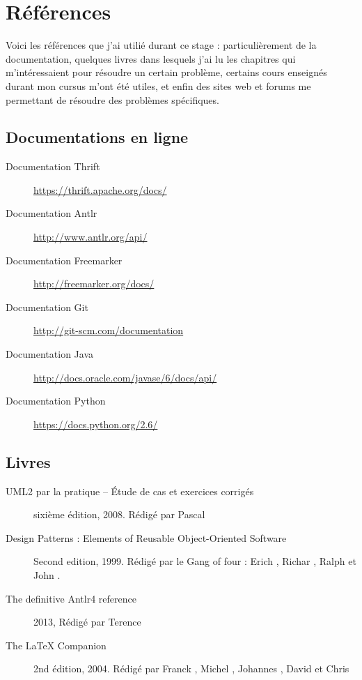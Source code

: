 \chapter{Références}
Voici les références que j'ai utilié durant ce stage : particulièrement de la documentation, quelques livres dans lesquels j'ai lu les chapitres qui m'intéressaient pour résoudre un certain problème, certains cours enseignés durant mon cursus m'ont été utiles, et enfin des sites web et forums me permettant de résoudre des problèmes spécifiques.

\section{Documentations en ligne}
\begin{description}
	\item[Documentation Thrift] \url{https://thrift.apache.org/docs/}
	\item[Documentation Antlr] \url{http://www.antlr.org/api/}
	\item[Documentation Freemarker] \url{http://freemarker.org/docs/}
	\item[Documentation Git] \url{http://git-scm.com/documentation}	
	\item[Documentation Java] \url{http://docs.oracle.com/javase/6/docs/api/}
	\item[Documentation Python] \url{https://docs.python.org/2.6/}
\end{description}

\section{Livres}
	\begin{description}
	\item[UML2 par la pratique -- \'Etude de cas et exercices corrigés] sixième édition, 2008. Rédigé par Pascal 
	\item[Design Patterns : Elements of Reusable Object-Oriented Software] Second edition, 1999. Rédigé par le Gang of four : Erich , Richar , Ralph  et John .	
		\item[The definitive Antlr4 reference] 2013, Rédigé par Terence 
	\item[The \LaTeX{} Companion] 2nd édition, 2004. Rédigé par Franck , Michel , Johannes , David  et Chris  
\end{description}
